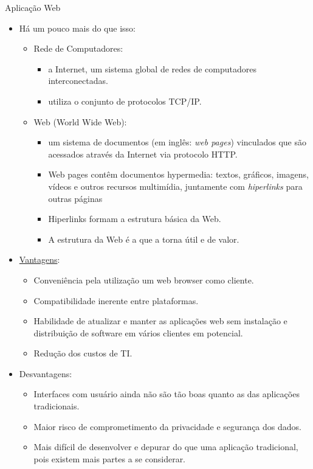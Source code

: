 \begin{frame}{Aplicação Web}
  \begin{itemize}
    \item Há um pouco mais do que isso:
    \begin{itemize}
      \item Rede de Computadores:
      \begin{itemize}
        \item a \alert{Internet}, um sistema global de redes de computadores interconectadas.
        \item utiliza o conjunto de protocolos TCP/IP.
      \end{itemize}
      \item Web (World Wide Web):
      \begin{itemize}
	\item um sistema de documentos (em inglês: \textit{web pages}) \alert{vinculados} que são acessados através 
	  da Internet via protocolo HTTP.
	\item Web pages contêm documentos \alert{hypermedia}: textos, gráficos, imagens, vídeos e outros recursos multimídia, juntamente com \textit{hiperlinks} para outras páginas
	\item \alert{Hiperlinks} formam a \alert{estrutura básica} da Web.
	\item A estrutura da Web é a que a torna \alert{útil} e de \alert{valor}.
      \end{itemize}
    \end{itemize}
    \item \underline{Vantagens}:
    \begin{itemize}
      \item \alert{Conveniência} pela utilização um web browser como cliente. 
      \item \alert{Compatibilidade} inerente entre plataformas.
      \item Habilidade de \alert{atualizar} e \alert{manter} as aplicações web sem instalação e distribuição de software
        em vários clientes em potencial.
      \item \alert{Redução} dos custos de TI.
    \end{itemize}
    \item \alert{Desvantagens}:
    \begin{itemize}
      \item Interfaces com usuário ainda \alert{não são tão boas} quanto as das aplicações tradicionais.
      \item Maior risco de \alert{comprometimento} da \alert{privacidade} e \alert{segurança dos dados}.
      \item Mais \alert{difícil} de \alert{desenvolver} e \alert{depurar} do que uma aplicação tradicional, pois 
        existem mais partes a se considerar.
    \end{itemize}
  \end{itemize}
\end{frame}
